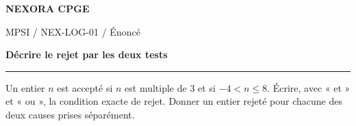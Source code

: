 \documentclass[11pt,a4paper]{article}
\begin{document}
{\small\bfseries\color{nexorablue} NEXORA CPGE}\par
{\small MPSI / NEX-LOG-01 / Énoncé}\par
{\LARGE\bfseries Décrire le rejet par les deux tests}\par
\vspace{0.25em}\hrule\vspace{0.6em}

Un entier $n$ est accepté si $n$ est multiple de $3$ et si $-4<n\le8$. Écrire, avec « et » et « ou », la condition exacte de rejet. Donner un entier rejeté pour chacune des deux causes prises séparément.
\end{document}
